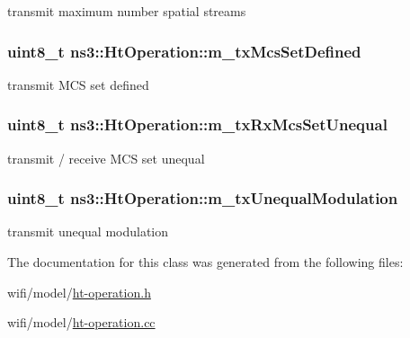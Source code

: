 transmit maximum number spatial streams 

\subsubsection[{\texorpdfstring{m\+\_\+tx\+Mcs\+Set\+Defined}{m_txMcsSetDefined}}]{\setlength{\rightskip}{0pt plus 5cm}uint8\+\_\+t ns3\+::\+Ht\+Operation\+::m\+\_\+tx\+Mcs\+Set\+Defined\hspace{0.3cm}{\ttfamily [private]}}\hypertarget{classns3_1_1HtOperation_a9a9e9d670368ef55932943ab8d56ce2c}{}\label{classns3_1_1HtOperation_a9a9e9d670368ef55932943ab8d56ce2c}


transmit M\+CS set defined 

\subsubsection[{\texorpdfstring{m\+\_\+tx\+Rx\+Mcs\+Set\+Unequal}{m_txRxMcsSetUnequal}}]{\setlength{\rightskip}{0pt plus 5cm}uint8\+\_\+t ns3\+::\+Ht\+Operation\+::m\+\_\+tx\+Rx\+Mcs\+Set\+Unequal\hspace{0.3cm}{\ttfamily [private]}}\hypertarget{classns3_1_1HtOperation_af1093beb3dd77ef3b6dfea9a5bef4ff1}{}\label{classns3_1_1HtOperation_af1093beb3dd77ef3b6dfea9a5bef4ff1}


transmit / receive M\+CS set unequal 

\subsubsection[{\texorpdfstring{m\+\_\+tx\+Unequal\+Modulation}{m_txUnequalModulation}}]{\setlength{\rightskip}{0pt plus 5cm}uint8\+\_\+t ns3\+::\+Ht\+Operation\+::m\+\_\+tx\+Unequal\+Modulation\hspace{0.3cm}{\ttfamily [private]}}\hypertarget{classns3_1_1HtOperation_a70b920516346e7c0b97e0e465643bc51}{}\label{classns3_1_1HtOperation_a70b920516346e7c0b97e0e465643bc51}


transmit unequal modulation 



The documentation for this class was generated from the following files\+:\begin{DoxyCompactItemize}
\item 
wifi/model/\hyperlink{ht-operation_8h}{ht-\/operation.\+h}\item 
wifi/model/\hyperlink{ht-operation_8cc}{ht-\/operation.\+cc}\end{DoxyCompactItemize}
